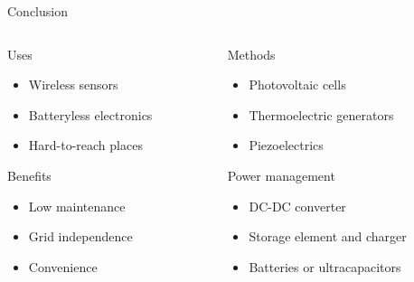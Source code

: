 \documentclass{beamer}
\begin{document}
\begin{frame}{Conclusion}
  \begin{columns}
    \begin{column}{0.45\textwidth}
      \begin{block}{Uses}
        \begin{itemize}
          \item Wireless sensors
	  \item Batteryless electronics
	  \item Hard-to-reach places
        \end{itemize}
      \end{block}
      \begin{block}{Benefits}
        \begin{itemize}
          \item Low maintenance
	  \item Grid independence
	  \item Convenience
        \end{itemize}
      \end{block}
    \end{column}
    \begin{column}{0.5\textwidth}
      \begin{block}{Methods}
        \begin{itemize}
          \item Photovoltaic cells
	  \item Thermoelectric generators
	  \item Piezoelectrics
        \end{itemize}
      \end{block}
      \begin{block}{Power management}
        \begin{itemize}
          \item DC-DC converter
	  \item Storage element and charger
	  \item Batteries or ultracapacitors
        \end{itemize}
      \end{block}
    \end{column}
  \end{columns}
\end{frame}
\end{document}
